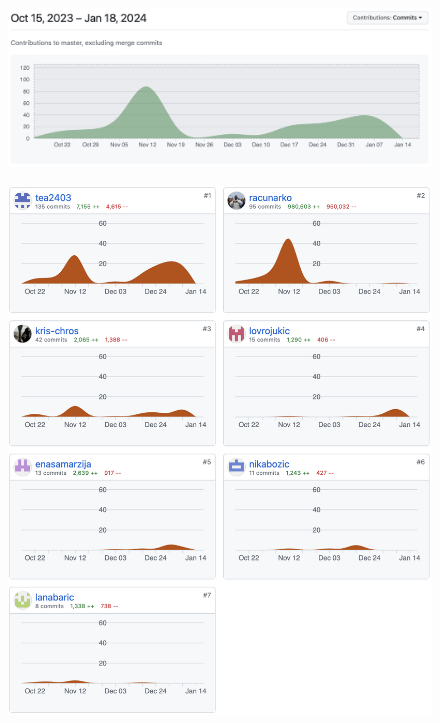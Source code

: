 		 \begin{figure}[H]
			\includegraphics[scale=0.45]{dijagrami/d_pregleda1.png}%
			\centering
			\label{fig:promjene}
		\end{figure}
		 \begin{figure}[H]
			\includegraphics[scale=0.45]{dijagrami/d_pregleda2.png}%
			\centering
			\label{fig:promjene}
		\end{figure}
		
	